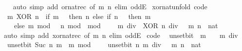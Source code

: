 \begin{isabellebody}
%
\isadelimproof
\ \ %
\endisadelimproof
%
\isatagproof
{}\isamarkupfalse%
\ {\isacharparenleft}{\kern0pt}auto\ simp\ add{\isacharcolon}{\kern0pt}\ or{\isacharunderscore}{\kern0pt}nat{\isacharunderscore}{\kern0pt}rec\ {\isacharbrackleft}{\kern0pt}of\ m\ n{\isacharbrackright}{\kern0pt}\ elim{\isacharcolon}{\kern0pt}\ oddE{\isacharparenright}{\kern0pt}%
\endisatagproof
{\isafoldproof}%
%
\isadelimproof
\isanewline
%
\endisadelimproof
\isanewline
{}\isamarkupfalse%
\ xor{\isacharunderscore}{\kern0pt}nat{\isacharunderscore}{\kern0pt}unfold\ {\isacharbrackleft}{\kern0pt}code{\isacharbrackright}{\kern0pt}{\isacharcolon}{\kern0pt}\isanewline
\ \ {\isacartoucheopen}m\ XOR\ n\ {\isacharequal}{\kern0pt}\ {\isacharparenleft}{\kern0pt}if\ m\ {\isacharequal}{\kern0pt}\ {}\ then\ n\ else\ if\ n\ {\isacharequal}{\kern0pt}\ {}\ then\ m\isanewline
\ \ \ \ else\ {\isacharparenleft}{\kern0pt}m\ mod\ {}\ {\isacharplus}{\kern0pt}\ n\ mod\ {}{\isacharparenright}{\kern0pt}\ mod\ {}\ {\isacharplus}{\kern0pt}\ {}\ {\isacharasterisk}{\kern0pt}\ {\isacharparenleft}{\kern0pt}{\isacharparenleft}{\kern0pt}m\ div\ {}{\isacharparenright}{\kern0pt}\ XOR\ {\isacharparenleft}{\kern0pt}n\ div\ {}{\isacharparenright}{\kern0pt}{\isacharparenright}{\kern0pt}{\isacharparenright}{\kern0pt}{\isacartoucheclose}\ \ m\ n\ {\isacharcolon}{\kern0pt}{\isacharcolon}{\kern0pt}\ nat\isanewline
%
\isadelimproof
\ \ %
\endisadelimproof
%
\isatagproof
{}\isamarkupfalse%
\ {\isacharparenleft}{\kern0pt}auto\ simp\ add{\isacharcolon}{\kern0pt}\ xor{\isacharunderscore}{\kern0pt}nat{\isacharunderscore}{\kern0pt}rec\ {\isacharbrackleft}{\kern0pt}of\ m\ n{\isacharbrackright}{\kern0pt}\ elim{\isacharbang}{\kern0pt}{\isacharcolon}{\kern0pt}\ oddE{\isacharparenright}{\kern0pt}%
\endisatagproof
{\isafoldproof}%
%
\isadelimproof
\isanewline
%
\endisadelimproof
\isanewline
{}\isamarkupfalse%
\ {\isacharbrackleft}{\kern0pt}code{\isacharbrackright}{\kern0pt}{\isacharcolon}{\kern0pt}\isanewline
\ \ {\isacartoucheopen}unset{\isacharunderscore}{\kern0pt}bit\ {}\ m\ {\isacharequal}{\kern0pt}\ {}\ {\isacharasterisk}{\kern0pt}\ {\isacharparenleft}{\kern0pt}m\ div\ {}{\isacharparenright}{\kern0pt}{\isacartoucheclose}\isanewline
\ \ {\isacartoucheopen}unset{\isacharunderscore}{\kern0pt}bit\ {\isacharparenleft}{\kern0pt}Suc\ n{\isacharparenright}{\kern0pt}\ m\ {\isacharequal}{\kern0pt}\ m\ mod\ {}\ {\isacharplus}{\kern0pt}\ {}\ {\isacharasterisk}{\kern0pt}\ unset{\isacharunderscore}{\kern0pt}bit\ n\ {\isacharparenleft}{\kern0pt}m\ div\ {}{\isacharparenright}{\kern0pt}{\isacartoucheclose}\ \ m\ n\ {\isacharcolon}{\kern0pt}{\isacharcolon}{\kern0pt}\ nat\isanewline

\end{isabellebody}
